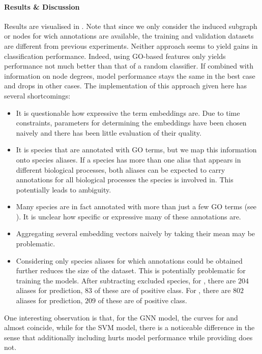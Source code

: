 \documentclass[
	fontsize=10pt, %
	twoside=true, %
	secnumdepth=1, %
  toc=indentunnumbered %
]{kaobook}
\begin{document}
\paragraph{Results \& Discussion} Results are visualised in
. Note that since we only consider the induced
subgraph or nodes for wich annotations are available, the training and
validation datasets are different from previous experiments.
%
Neither approach seems to yield gains in classification performance. Indeed,
using GO-based features only yields performance not much better than that of a
random classifier. If combined with information on node degrees, model
performance stays the same in the best case and drops in other cases.
%
The implementation of this approach given here has several shortcomings:
\begin{itemize}
\item It is questionable how expressive the term embeddings are. Due to time
  constraints, parameters for
  determining the embeddings have been chosen naively and there has been little
  evaluation of their quality.
\item It is species that are annotated with GO terms, but we map this
  information onto species aliases. If a species has more than one alias that
  appears in different biological processes, both aliases can be expected to
  carry annotations for all biological processes the species is involved in.
  This potentially leads to ambiguity.
\item Many species are in fact annotated with more than just a few GO terms (see
  ). It is unclear how specific or expressive many of
  these annotations are.
\item Aggregating several embedding vectors naively by taking their mean may be problematic.
\item Considering only species aliases for which annotations could be obtained
  further reduces the size of the dataset. This is potentially problematic for
  training the models. After subtracting excluded species, for \ADLast, there
  are $204$ aliases for prediction, $83$ of these are of positive class. For
  \PDMap{}, there are $802$ aliases for prediction, $209$ of these are of positive class.
\end{itemize}

One interesting observation is that, for the GNN model, the curves for
 and  almost coincide, while for the SVM
model, there is a noticeable difference in the sense that additionally including
 hurts model performance while providing 
does not.
\end{document}
